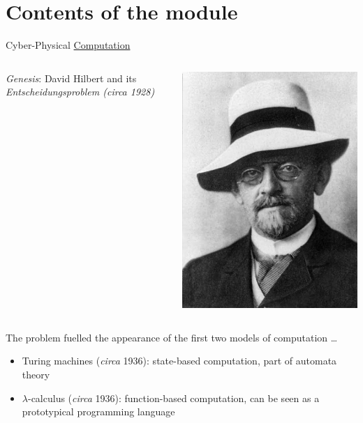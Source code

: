 \documentclass[aspectratio=169]{beamer}
\begin{document}
\section{Contents of the module}

\begin{frame}{Cyber-Physical \underline{Computation}}

  \begin{minipage}[0.3\textheight]{\textwidth}
  \begin{columns}[c]
  \begin{column}{0.6\textwidth}
    \emph{Genesis}: David Hilbert and its \emph{\alert{Entscheidungsproblem} (\emph{circa} 1928)}
  \end{column}
  \begin{column}{0.2\textwidth}
    \includegraphics[scale=0.15]{Images/Hilbert.jpg}
  \end{column}
  \end{columns}
  \end{minipage}

  \vspace{0.5cm}
  The problem fuelled the appearance of the first two models of computation \dots
  \begin{itemize}
  \item Turing machines (\emph{circa} 1936): state-based computation, part of automata theory
  \item $\lambda$-calculus (\emph{circa} 1936): function-based computation, can be seen as a prototypical
    programming language
  \end{itemize}
\end{frame}
\end{document}
